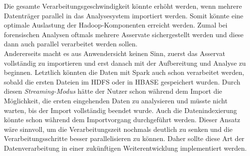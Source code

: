 \noindent
Die gesamte Verarbeitungsgeschwindigkeit könnte erhöht werden, wenn mehrere Datenträger parallel in das Analysesystem importiert werden. Somit könnte eine optimale Auslastung der Hadoop-Komponenten erreicht werden. Zumal bei forensischen Analysen oftmals mehrere Asservate sichergestellt werden und diese dann auch parallel verarbeitet werden sollen.\\

\noindent
Andererseits macht es aus Anwendersicht keinen Sinn, zuerst das Asservat vollständig zu importieren und erst danach mit der Aufbereitung und Analyse zu beginnen. Letztlich könnten die Daten mit Spark auch schon verarbeitet werden, sobald die ersten Dateien im HDFS oder in HBASE gespeichert wurden. Durch diesen \textit{Streaming-Modus} hätte der Nutzer schon während dem Import die Möglichkeit, die ersten eingehenden Daten zu analysieren und müsste nicht warten, bis der Import vollständig beendet wurde. Auch die Datenindexierung könnte schon während dem Importvorgang durchgeführt werden. Dieser Ansatz wäre sinnvoll, um die Verarbeitungszeit nochmals deutlich zu senken und die Verarbeitungsschritte besser parallelisieren zu können. Daher sollte diese Art der Datenverarbeitung in einer zukünftigen Weiterentwicklung implementiert werden.